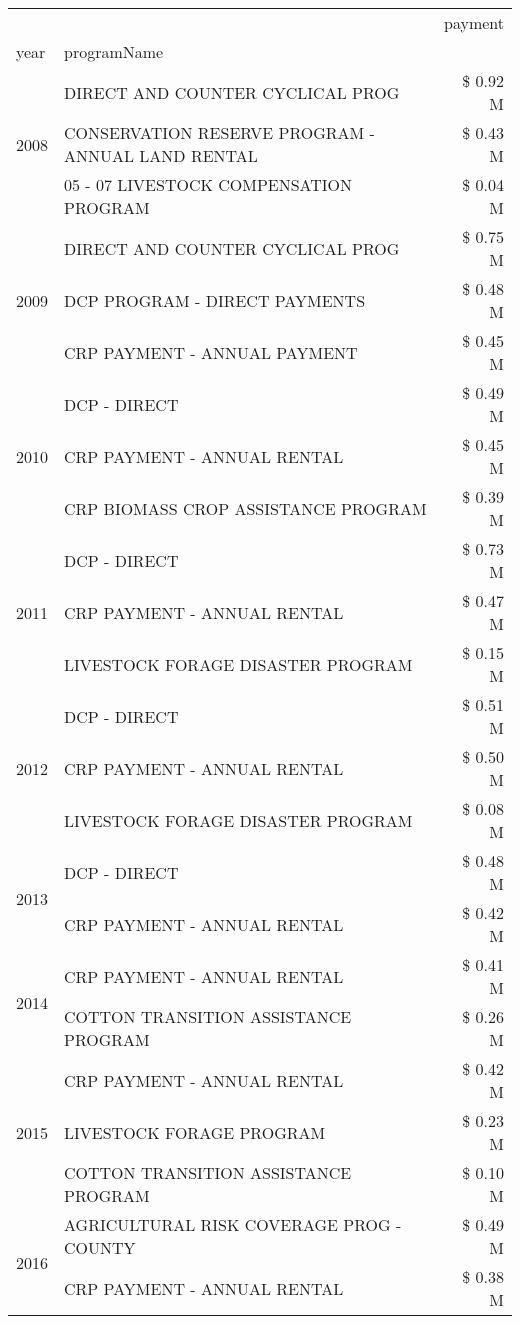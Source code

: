 \begin{tabular}{llr}
\toprule
 &  & payment \\
year & programName &  \\
\midrule
\multirow[t]{3}{*}{2008} & DIRECT AND COUNTER CYCLICAL PROG & \$ 0.92 M \\
 & CONSERVATION RESERVE PROGRAM - ANNUAL LAND RENTAL & \$ 0.43 M \\
 & 05 - 07 LIVESTOCK COMPENSATION PROGRAM & \$ 0.04 M \\
\cline{1-3}
\multirow[t]{3}{*}{2009} & DIRECT AND COUNTER CYCLICAL PROG & \$ 0.75 M \\
 & DCP PROGRAM - DIRECT PAYMENTS & \$ 0.48 M \\
 & CRP PAYMENT - ANNUAL PAYMENT & \$ 0.45 M \\
\cline{1-3}
\multirow[t]{3}{*}{2010} & DCP - DIRECT & \$ 0.49 M \\
 & CRP PAYMENT - ANNUAL RENTAL & \$ 0.45 M \\
 & CRP BIOMASS CROP ASSISTANCE PROGRAM & \$ 0.39 M \\
\cline{1-3}
\multirow[t]{3}{*}{2011} & DCP - DIRECT & \$ 0.73 M \\
 & CRP PAYMENT - ANNUAL RENTAL & \$ 0.47 M \\
 & LIVESTOCK FORAGE DISASTER PROGRAM & \$ 0.15 M \\
\cline{1-3}
\multirow[t]{3}{*}{2012} & DCP - DIRECT & \$ 0.51 M \\
 & CRP PAYMENT - ANNUAL RENTAL & \$ 0.50 M \\
 & LIVESTOCK FORAGE DISASTER PROGRAM & \$ 0.08 M \\
\cline{1-3}
\multirow[t]{2}{*}{2013} & DCP - DIRECT & \$ 0.48 M \\
 & CRP PAYMENT - ANNUAL RENTAL & \$ 0.42 M \\
\cline{1-3}
\multirow[t]{2}{*}{2014} & CRP PAYMENT - ANNUAL RENTAL & \$ 0.41 M \\
 & COTTON TRANSITION ASSISTANCE PROGRAM & \$ 0.26 M \\
\cline{1-3}
\multirow[t]{3}{*}{2015} & CRP PAYMENT - ANNUAL RENTAL & \$ 0.42 M \\
 & LIVESTOCK FORAGE PROGRAM & \$ 0.23 M \\
 & COTTON TRANSITION ASSISTANCE PROGRAM & \$ 0.10 M \\
\cline{1-3}
\multirow[t]{3}{*}{2016} & AGRICULTURAL RISK COVERAGE PROG - COUNTY & \$ 0.49 M \\
 & CRP PAYMENT - ANNUAL RENTAL & \$ 0.38 M \\

\end{tabular}
